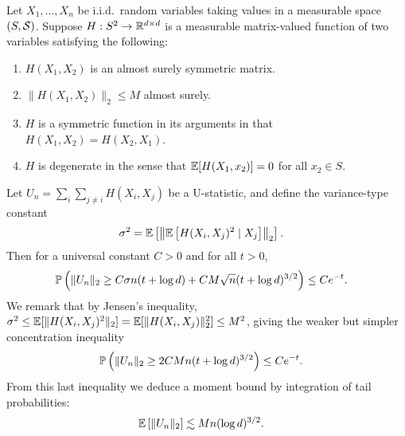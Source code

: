 \begin{lemma}
  \label{lem:kernel_app_ustat_matrix_concentration}

  Let $X_1, \ldots, X_n$ be i.i.d.\ random variables
  taking values in a measurable space $(S, \cS)$.
  Suppose
  $H: S^2 \to \R^{d \times d}$
  is a measurable matrix-valued function
  of two variables
  satisfying the following:
  \begin{enumerate}[label=(\roman*)]

    \item
      $H(X_1, X_2)$ is an almost surely symmetric matrix.

    \item
      $\|H(X_1, X_2)\|_2 \leq M$ almost surely.

    \item
      $H$ is a symmetric function in its arguments in that
      $H(X_1, X_2) = H(X_2, X_1)$.

    \item
      $H$ is degenerate in the sense that
      $\E[H(X_1, x_2)] = 0$ for all $x_2 \in S$.

  \end{enumerate}
  Let $U_n = \sum_i \sum_{j \neq i} H(X_i, X_j)$
  be a U-statistic,
  and define the variance-type constant
  \begin{align*}
    \sigma^2
    &=
    \E\left[
      \left\|
      \E\left[
        H(X_i, X_j)^2
        \mid X_j
      \right]
      \right\|_2
    \right].
  \end{align*}
  Then for a universal constant $C > 0$
  and for all $t > 0$,
  \begin{align*}
    \P\left(
      \|U_n\|_2
      \geq
      C \sigma n (t + \log d)
      + C M \sqrt{n} (t + \log d)^{3/2}
    \right)
    &\leq
    C e^{-t}.
  \end{align*}
  We remark that by Jensen's inequality,
  $\sigma^2 \leq \E[ \| H(X_i, X_j)^2 \|_2 ]
  = \E[ \| H(X_i, X_j) \|_2^2 ]
  \leq M^2$,
  giving the weaker but simpler concentration inequality
  \begin{align*}
    \P\left(
      \|U_n\|_2
      \geq
      2 C M n
      (t + \log d)^{3/2}
    \right)
    &\leq
    C e^{-t}.
  \end{align*}
  From this last inequality we deduce a moment bound
  by integration of tail probabilities:
  \begin{align*}
    \E\left[
      \|U_n\|_2
    \right]
    &\lesssim
    M n (\log d)^{3/2}.
  \end{align*}

\end{lemma}

